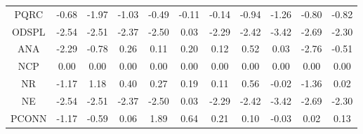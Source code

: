 \begin{longtable}{ | c || c | c | c | c | c | c | c | c | c || c |}
PQRC &  \cellcolor[HTML]{FFEFEF} -0.68 &  \cellcolor[HTML]{FFCFCF} -1.97 &  \cellcolor[HTML]{FFE7E7} -1.03 &  \cellcolor[HTML]{FFEFEF} -0.49 &  \cellcolor[HTML]{FFFFFF} -0.11 &  \cellcolor[HTML]{FFFFFF} -0.14 &  \cellcolor[HTML]{FFE7E7} -0.94 &  \cellcolor[HTML]{FFDFDF} -1.26 &  \cellcolor[HTML]{FFE7E7} -0.80 &  \cellcolor[HTML]{FFE7E7} -0.82 \\
ODSPL &  \cellcolor[HTML]{FFBFBF} -2.54 &  \cellcolor[HTML]{FFBFBF} -2.51 &  \cellcolor[HTML]{FFC7C7} -2.37 &  \cellcolor[HTML]{FFBFBF} -2.50 &  \cellcolor[HTML]{FFFFFF} 0.03 &  \cellcolor[HTML]{FFC7C7} -2.29 &  \cellcolor[HTML]{FFBFBF} -2.42 &  \cellcolor[HTML]{FFA7A7} -3.42 &  \cellcolor[HTML]{FFBFBF} -2.69 &  \cellcolor[HTML]{FFC7C7} -2.30 \\
ANA &  \cellcolor[HTML]{FFC7C7} -2.29 &  \cellcolor[HTML]{FFEFEF} -0.78 &  \cellcolor[HTML]{F7F7FF} 0.26 &  \cellcolor[HTML]{FFFFFF} 0.11 &  \cellcolor[HTML]{F7F7FF} 0.20 &  \cellcolor[HTML]{FFFFFF} 0.12 &  \cellcolor[HTML]{EFEFFF} 0.52 &  \cellcolor[HTML]{FFFFFF} 0.03 &  \cellcolor[HTML]{FFB7B7} -2.76 &  \cellcolor[HTML]{FFEFEF} -0.51 \\
NCP &  \cellcolor[HTML]{FFFFFF} 0.00 &  \cellcolor[HTML]{FFFFFF} 0.00 &  \cellcolor[HTML]{FFFFFF} 0.00 &  \cellcolor[HTML]{FFFFFF} 0.00 &  \cellcolor[HTML]{FFFFFF} 0.00 &  \cellcolor[HTML]{FFFFFF} 0.00 &  \cellcolor[HTML]{FFFFFF} 0.00 &  \cellcolor[HTML]{FFFFFF} 0.00 &  \cellcolor[HTML]{FFFFFF} 0.00 &  \cellcolor[HTML]{FFFFFF} 0.00 \\
NR &  \cellcolor[HTML]{FFDFDF} -1.17 &  \cellcolor[HTML]{DFDFFF} 1.18 &  \cellcolor[HTML]{F7F7FF} 0.40 &  \cellcolor[HTML]{F7F7FF} 0.27 &  \cellcolor[HTML]{F7F7FF} 0.19 &  \cellcolor[HTML]{FFFFFF} 0.11 &  \cellcolor[HTML]{EFEFFF} 0.56 &  \cellcolor[HTML]{FFFFFF} -0.02 &  \cellcolor[HTML]{FFDFDF} -1.36 &  \cellcolor[HTML]{FFFFFF} 0.02 \\
NE &  \cellcolor[HTML]{FFBFBF} -2.54 &  \cellcolor[HTML]{FFBFBF} -2.51 &  \cellcolor[HTML]{FFC7C7} -2.37 &  \cellcolor[HTML]{FFBFBF} -2.50 &  \cellcolor[HTML]{FFFFFF} 0.03 &  \cellcolor[HTML]{FFC7C7} -2.29 &  \cellcolor[HTML]{FFBFBF} -2.42 &  \cellcolor[HTML]{FFA7A7} -3.42 &  \cellcolor[HTML]{FFBFBF} -2.69 &  \cellcolor[HTML]{FFC7C7} -2.30 \\
PCONN &  \cellcolor[HTML]{FFDFDF} -1.17 &  \cellcolor[HTML]{FFEFEF} -0.59 &  \cellcolor[HTML]{FFFFFF} 0.06 &  \cellcolor[HTML]{CFCFFF} 1.89 &  \cellcolor[HTML]{EFEFFF} 0.64 &  \cellcolor[HTML]{F7F7FF} 0.21 &  \cellcolor[HTML]{FFFFFF} 0.10 &  \cellcolor[HTML]{FFFFFF} -0.03 &  \cellcolor[HTML]{FFFFFF} 0.02 &  \cellcolor[HTML]{FFFFFF} 0.13 \\

\end{longtable}
